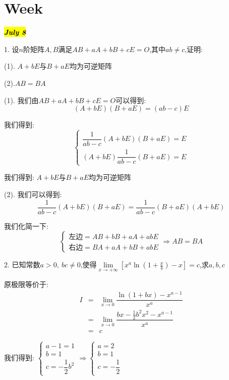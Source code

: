 \section{Week }

\hl{\textbf{\textit{July 8}}}

1. 设$n$阶矩阵$A,B$满足$AB+aA+bB+cE=O$,其中$ab\neq c$,证明: 

(1). $A+bE$与$B+aE$均为可逆矩阵 

(2).$AB=BA$
\begin{solution}
	
	(1). 我们由$AB+aA+bB+cE=O$可以得到: 
	$$(A+bE)(B+aE)=(ab-c)E$$
	
	我们得到: $$\left\lbrace
	\begin{array}{l}
		\dfrac{1}{ab-c}(A+bE)(B+aE)=E\\
		(A+bE)\dfrac{1}{ab-c}(B+aE)=E
	\end{array}
	\right. $$
	
	我们得到: $A+bE$与$B+aE$均为可逆矩阵 
	
	(2). 我们可以得到: 
	$$\dfrac{1}{ab-c}(A+bE)(B+aE)=\dfrac{1}{ab-c}(B+aE)(A+bE)$$
	
	我们化简一下: 
	$$\left\lbrace
	\begin{array}{l}
		\text{左边}=AB+bB+aA+abE\\
		\text{右边}=BA+aA+bB+abE
	\end{array}
	\right. \Rightarrow AB=BA$$
\end{solution}

2. 已知常数$a>0,\ bc\neq 0$,使得$\lim\limits_{x\rightarrow+\infty}[x^a\ln(1+\frac{x}{b})-x]=c$,求$a,b,c$
\begin{solution}
	
	原极限等价于: 
	\begin{eqnarray*}
		I&=&\lim\limits_{x\rightarrow 0 }\dfrac{\ln(1+bx)-x^{a-1}}{x^a}\\
		&=&\lim\limits_{x\rightarrow 0 }\dfrac{bx-\frac{1}{2}b^2x^2-x^{a-1}}{x^a}\\
		&=&c
	\end{eqnarray*}
	
	我们得到: $\left\lbrace
	\begin{array}{l}
		a-1=1\\
		b=1\\
		c=-\dfrac{1}{2}b^2
	\end{array}
	\right. \Rightarrow \left\lbrace
	\begin{array}{l}
		a=2\\
		b=1\\
		c=-\dfrac{1}{2}
	\end{array}
	\right. $
\end{solution}

